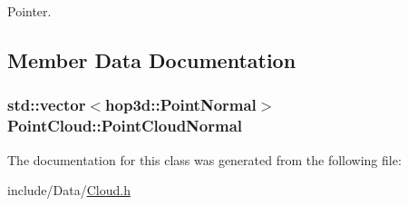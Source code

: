 Pointer. 



\subsection{Member Data Documentation}
\hypertarget{class_point_cloud_a96c71850c381b10db6a01ff979f1b6a5}{
\subsubsection[{Point\-Cloud\-Normal}]{\setlength{\rightskip}{0pt plus 5cm}std\-::vector$<$hop3d\-::\-Point\-Normal$>$ Point\-Cloud\-::\-Point\-Cloud\-Normal}}\label{class_point_cloud_a96c71850c381b10db6a01ff979f1b6a5}


The documentation for this class was generated from the following file\-:\begin{DoxyCompactItemize}
\item 
include/\-Data/\hyperlink{_cloud_8h}{Cloud.\-h}\end{DoxyCompactItemize}
